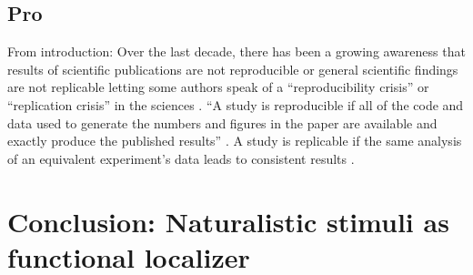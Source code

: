 \subsection{Pro}






From introduction:
Over the last decade, there has been a growing awareness that results of
scientific publications are not reproducible or general scientific findings are
not replicable letting some authors speak of a ``reproducibility crisis'' or
``replication crisis'' in the sciences \citep{baker2016reproducibility,
plesser2018reproducibility, stupple2019reproducibility, nosek2022replicability}.
``A study is reproducible if all of the code and data used to generate the
numbers and figures in the paper are available and exactly produce the published
results'' \citep{leek2017most}.
A study is replicable if the same analysis of an equivalent experiment's data
leads to consistent results \citep{dubois2016building, leek2017most}.


\section{Conclusion: Naturalistic stimuli as functional localizer}

